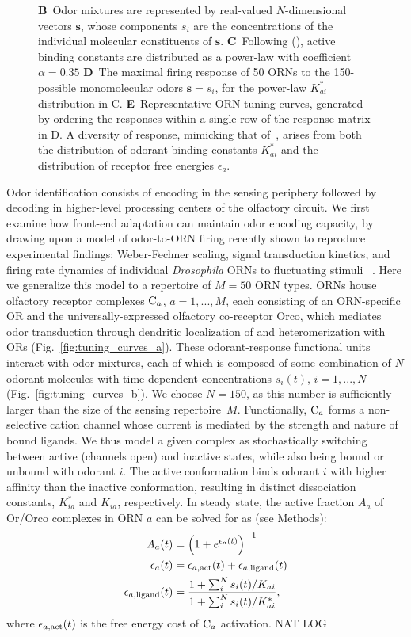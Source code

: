 \documentclass[9pt,twocolumn,twoside,lineno]{pnas-new}
\begin{document}
\begin{figure}[!tb]
{{			\textbf{B}~Odor mixtures are represented by real-valued $N$-dimensional vectors $\mathbf s$, whose components $s_i$ are the concentrations of  the individual molecular constituents  of $\mathbf s$. 
			\textbf{C}~Following (), active binding constants are distributed as a power-law with coefficient $\alpha=0.35$
			\textbf{D}~The maximal firing response of 50 ORNs to the 150-possible monomolecular odors $\mathbf s = s_i$, for the power-law $K^*_{ai}$ distribution in C.
			\textbf{E}~Representative ORN tuning curves, generated by ordering the responses within a single row of the response matrix in D. A diversity of response, mimicking that of~\cite{hallem_carlson}, arises from both the distribution of odorant binding constants $K^*_{ai}$ and the distribution of receptor free energies $\epsilon_a$.}}
	\label{fig:tuning_curves}
\end{figure}

Odor identification consists of encoding in the sensing periphery followed by decoding in higher-level processing centers of the olfactory circuit. We first examine how front-end adaptation can maintain odor encoding capacity,  by  drawing upon a model of odor-to-ORN firing recently shown to reproduce experimental findings: Weber-Fechner scaling, signal transduction kinetics, and firing rate dynamics of individual \textit{Drosophila} ORNs to fluctuating stimuli ~\cite{srinivas_elife}. Here we generalize this model to a repertoire of $M=50$ ORN types. ORNs house olfactory receptor complexes $\textup{C}_a$, $a=1,...,M$, each consisting of an ORN-specific OR and the universally-expressed olfactory co-receptor Orco, which mediates odor transduction through dendritic localization of and heteromerization with ORs (Fig.~\ref{fig:tuning_curves_a}). These odorant-response functional units interact with odor mixtures, each of which is composed of some combination of $N$ odorant molecules with time-dependent concentrations $s_i(t)$, $i=1,...,N$ (Fig.~\ref{fig:tuning_curves_b}). We choose $N=150$, as this number is sufficiently larger than the size of the sensing repertoire~$M$. Functionally, $\textup{C}_a$ forms a non-selective cation channel whose current is mediated by the strength and nature of bound ligands. We thus model a given complex as stochastically switching between active (channels open) and inactive states, while also being bound or unbound with odorant $i$. The active conformation binds odorant $i$ with higher affinity than the inactive conformation, resulting in distinct dissociation constants, $K^*_{ia}$ and $K_{ia}$, respectively. In steady state, the active fraction $A_a$ of Or/Orco complexes in ORN $a$ can be solved for as (see Methods):
\begin{align}
A_a(t) &= \left(1 + e^{\epsilon_a(t)}\right)^{-1} \nonumber \\
\epsilon_a(t) &= \epsilon_{a, \textup{act}}(t) + \epsilon_{a, \textup{ligand}}(t) \nonumber \\
\epsilon_{a, \textup{ligand}}(t) &= \frac{1 + \sum_i^N s_i(t)/K_{ai}}{1 + \sum_i^N s_i(t)/K^*_{ai}},
\label{eq:steady_state_act_OR}
\end{align}
where $\epsilon_{a, \textup{act}}(t)$ is the free energy cost of $\textup{C}_a$ activation. NAT LOG
\end{document}
